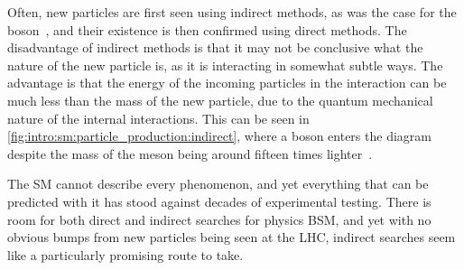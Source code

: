 Often, new particles are first seen using indirect methods, as was the case for 
the \PZ boson~\cite{HASERT1973138}, and their existence is then confirmed using 
direct methods.
The disadvantage of indirect methods is that it may not be conclusive what the 
nature of the new particle is, as it is interacting in somewhat subtle ways.
The advantage is that the energy of the incoming particles in the interaction 
can be much less than the mass of the new particle, due to the quantum 
mechanical nature of the internal interactions.
This can be seen in \cref{fig:intro:sm:particle_production:indirect}, where a 
\PW boson enters the diagram despite the mass of the \PBs meson being around 
fifteen times lighter~\cite{PDG2014}.

The \ac{SM} cannot describe every phenomenon, and yet everything that can be
predicted with it has stood against decades of experimental testing.
There is room for both direct and indirect searches for physics \acl{BSM}, and 
yet with no obvious bumps from new particles being seen at the \ac{LHC}, 
indirect searches seem like a particularly promising route to take.
